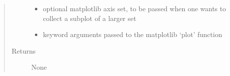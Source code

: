 \documentclass[letterpaper,10pt,english]{sphinxmanual}
\begin{document}
\begin{fulllineitems}
\begin{quote}
\begin{description}
\begin{itemize}
\item {} 
\sphinxAtStartPar
{} \textendash{} optional matplotlib axis set, to be passed when one wants to collect a subplot of a larger set

\item {} 
\sphinxAtStartPar
{} \textendash{} keyword arguments passed to the matplotlib ‘plot’ function

\end{itemize}

\item[{Returns}] \leavevmode
\sphinxAtStartPar
None

\end{description}\end{quote}

\end{fulllineitems}

\end{document}
